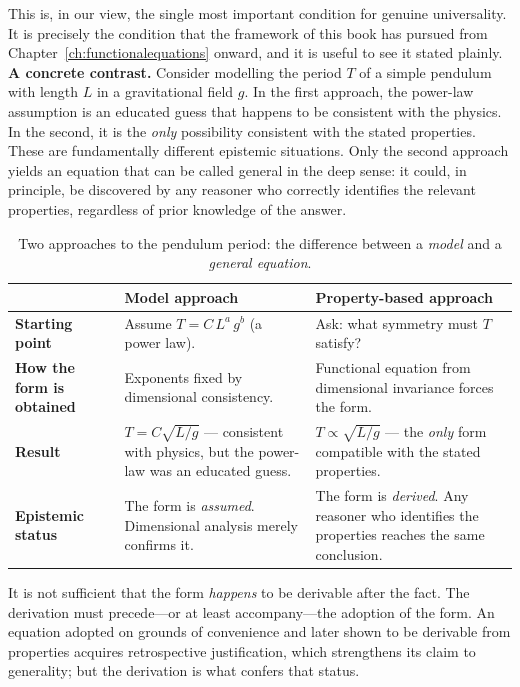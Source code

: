 This is, in our view, the single most important condition for
genuine universality.  It is precisely the condition that the
framework of this book has pursued from Chapter~\ref{ch:functionalequations}
onward, and it is useful to see it stated plainly. \textbf{A concrete contrast.}  Consider modelling the period $T$
of a simple pendulum with length $L$ in a gravitational field $g$. In the first approach, the power-law assumption is an educated
guess that happens to be consistent with the physics.  In the
second, it is the \emph{only} possibility consistent with the
stated properties.  These are fundamentally different epistemic
situations.  Only the second approach yields an equation that can
be called general in the deep sense: it could, in principle, be
discovered by any reasoner who correctly identifies the relevant
properties, regardless of prior knowledge of the answer.

\begin{table}[ht]
\centering
\caption{Two approaches to the pendulum period: the difference
  between a \emph{model} and a \emph{general equation}.}
\label{tab:ucq:pendulum}
\renewcommand{\arraystretch}{1.4}
\begin{tabularx}{\textwidth}{%
  >{\raggedright\arraybackslash}p{3cm}
  >{\raggedright\arraybackslash}X
  >{\raggedright\arraybackslash}X}
\toprule
\rowcolor{headerbg}
& \textbf{Model approach} & \textbf{Property-based approach} \\
\midrule
\textbf{Starting point}
  & Assume $T = C\,L^a\,g^b$ (a power law).
  & Ask: what symmetry must $T$ satisfy? \\
\textbf{How the form is obtained}
  & Exponents fixed by dimensional consistency.
  & Functional equation from dimensional invariance
    forces the form. \\
\textbf{Result}
  & $T = C\sqrt{L/g}$ --- consistent with physics,
    but the power-law was an educated guess.
  & $T \propto \sqrt{L/g}$ --- the \emph{only} form
    compatible with the stated properties. \\
\textbf{Epistemic status}
  & The form is \emph{assumed}.
    Dimensional analysis merely confirms it.
  & The form is \emph{derived}.
    Any reasoner who identifies the properties
    reaches the same conclusion. \\
\bottomrule
\end{tabularx}
\end{table}



\begin{remarkbox}
It is not sufficient that the form \emph{happens} to be derivable
after the fact.  The derivation must precede---or at least
accompany---the adoption of the form.  An equation adopted on
grounds of convenience and later shown to be derivable from
properties acquires retrospective justification, which strengthens
its claim to generality; but the derivation is what confers that
status.
\end{remarkbox}

